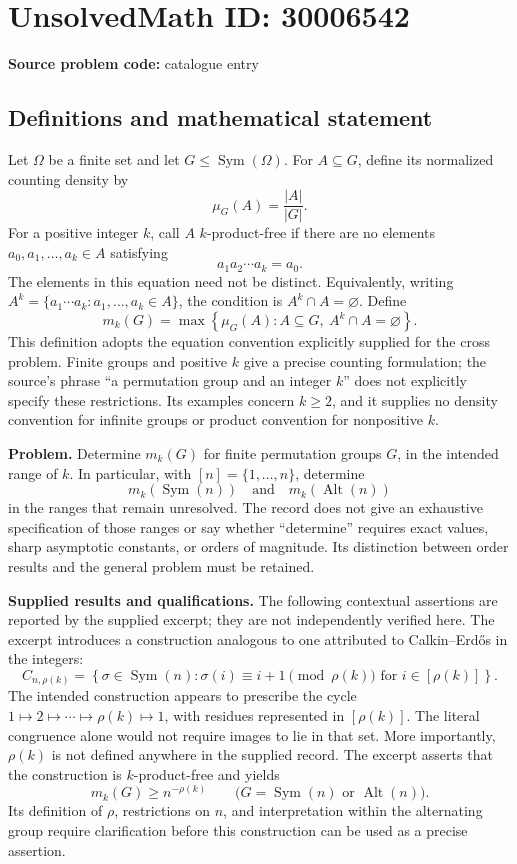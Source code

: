\documentclass[11pt]{article}
\begin{document}
\section*{UnsolvedMath ID: 30006542}
\textbf{Source problem code:} catalogue entry
\subsection{Definitions and mathematical statement}
Let \(\Omega\) be a finite set and let \(G\leq\operatorname{Sym}(\Omega)\). For \(A\subseteq G\), define its normalized counting density by
\[
\mu_G(A)=\frac{|A|}{|G|}.
\]
For a positive integer \(k\), call \(A\) \(k\)-product-free if there are no elements \(a_0,a_1,\ldots,a_k\in A\) satisfying
\[
a_1a_2\cdots a_k=a_0.
\]
The elements in this equation need not be distinct. Equivalently, writing \(A^k=\{a_1\cdots a_k:a_1,\ldots,a_k\in A\}\), the condition is \(A^k\cap A=\varnothing\). Define
\[
m_k(G)=\max\left\{\mu_G(A):A\subseteq G,\ A^k\cap A=\varnothing\right\}.
\]
This definition adopts the equation convention explicitly supplied for the cross problem. Finite groups and positive \(k\) give a precise counting formulation; the source's phrase ``a permutation group and an integer \(k\)'' does not explicitly specify these restrictions. Its examples concern \(k\geq2\), and it supplies no density convention for infinite groups or product convention for nonpositive \(k\).

\textbf{Problem.} Determine \(m_k(G)\) for finite permutation groups \(G\), in the intended range of \(k\). In particular, with \([n]=\{1,\ldots,n\}\), determine
\[
m_k(\operatorname{Sym}(n))\quad\text{and}\quad m_k(\operatorname{Alt}(n))
\]
in the ranges that remain unresolved. The record does not give an exhaustive specification of those ranges or say whether ``determine'' requires exact values, sharp asymptotic constants, or orders of magnitude. Its distinction between order results and the general problem must be retained.

\textbf{Supplied results and qualifications.} The following contextual assertions are reported by the supplied excerpt; they are not independently verified here. The excerpt introduces a construction analogous to one attributed to Calkin--Erd\H{o}s in the integers:
\[
C_{n,\rho(k)}=
\left\{\sigma\in\operatorname{Sym}(n):
\sigma(i)\equiv i+1\pmod{\rho(k)}\text{ for }i\in[\rho(k)]\right\}.
\]
The intended construction appears to prescribe the cycle \(1\mapsto2\mapsto\cdots\mapsto\rho(k)\mapsto1\), with residues represented in \([\rho(k)]\). The literal congruence alone would not require images to lie in that set. More importantly, \(\rho(k)\) is not defined anywhere in the supplied record. The excerpt asserts that the construction is \(k\)-product-free and yields
\[
m_k(G)\geq n^{-\rho(k)}
\qquad\bigl(G=\operatorname{Sym}(n)\text{ or }\operatorname{Alt}(n)\bigr).
\]
Its definition of \(\rho\), restrictions on \(n\), and interpretation within the alternating group require clarification before this construction can be used as a precise assertion.
\end{document}
